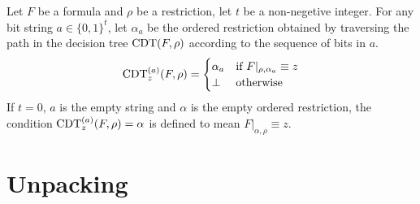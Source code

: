 \begin{definition}
    Let $F$ be a \demorgan formula and $\rho$ be a restriction, let $t$ be a non-negetive integer.  For any bit string $a \in \{0, 1\}^t$, let $\alpha_a$ be the ordered restriction obtained by traversing the path in the decision tree $\operatorname{CDT}(F, \rho)$ according to the sequence of bits in $a$.
    \begin{equation}
        \label{eq: CDTa}
        \operatorname{CDT}^{(a)}_z(F, \rho) =
        \begin{cases}
            \alpha_a & \text{if } F|_{\rho,\alpha_a} \equiv z \\
            \bot & \text{otherwise}
        \end{cases}
    \end{equation}
    If $t=0$, $a$ is the empty string and $\alpha$ is the empty ordered restriction, the condition $\operatorname{CDT}^{(a)}_z(F,\rho) = \alpha$ is defined to mean $F|_{\alpha,\rho} \equiv z$. 
\end{definition}

\section{Unpacking}
\label{sec:unpacking}


